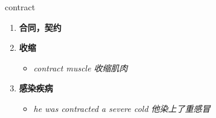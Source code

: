 
\begin{frame}
{\huge contract}
\begin{center}
\begin{enumerate}\Large
  \item \textbf{合同，契约}
  \item \textbf{收缩}
  \begin{itemize}
    \item \em{\Large{contract muscle 收缩肌肉}}
  \end{itemize}
  \item \textbf{感染疾病}
  \begin{itemize}
    \item \em{\Large{he was contracted a severe cold 他染上了重感冒}}
  \end{itemize}
\end{enumerate}
\end{center}
\end{frame}
